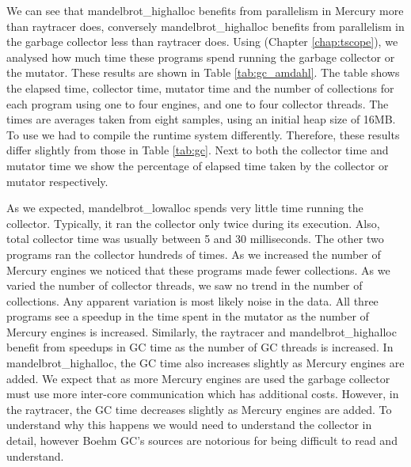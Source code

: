 

We can see that mandelbrot\_highalloc benefits from parallelism in Mercury
more than raytracer does,
conversely mandelbrot\_highalloc benefits from parallelism in the garbage
collector less than raytracer does.
Using \tscope (Chapter \ref{chap:tscope}),
we analysed how much time these programs spend running the garbage collector
or the mutator.
These results are shown in Table \ref{tab:gc_amdahl}.
The table shows the elapsed time, collector time, mutator time and the
number of collections for each program using one to four engines, and one
to four collector threads.
The times are averages taken from eight samples,
using an initial heap size of 16MB.
To use \tscope we had to compile the runtime system differently.
Therefore,
these results differ slightly from those in Table \ref{tab:gc}.
Next to both the collector time and mutator time
we show the percentage of elapsed time taken by the collector or mutator
respectively.

As we expected, mandelbrot\_lowalloc spends very little time running the collector.
Typically, it ran the collector only twice during its execution.
Also, total collector time was usually between 5 and 30 milliseconds.
The other two programs ran the collector hundreds of times.
As we increased the number of Mercury engines
we noticed that these programs made fewer collections.
As we varied the number of collector threads,
we saw no trend in the number of collections.
Any apparent variation is most likely noise in the data.
All three programs see a speedup in the time spent in the mutator as the
number of Mercury engines is increased.
Similarly,
the raytracer and mandelbrot\_highalloc benefit from speedups
in GC time as the number of GC threads is increased.
In mandelbrot\_highalloc,
the GC time also increases slightly as Mercury engines are added.
We expect that as more Mercury engines are used the garbage collector
must use more inter-core communication which has additional costs.
However, in the raytracer,
the GC time decreases slightly as Mercury engines are added.
To understand why this happens we would need to understand the collector in
detail,
however Boehm GC's sources are notorious for being difficult to read and
understand.

